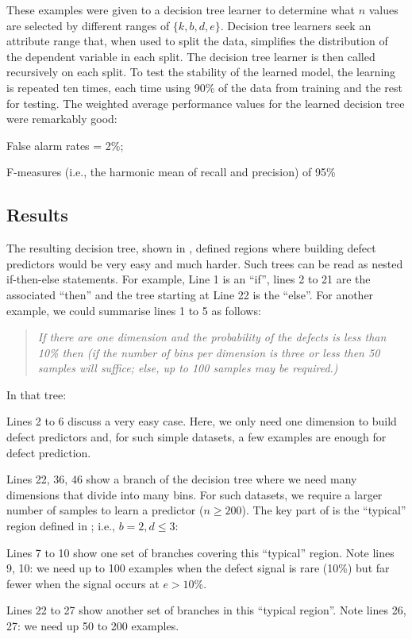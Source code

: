     These examples were given to a decision tree learner to determine what $n$ values are selected by different
    ranges of $\{k,b,d,e\}$. Decision tree learners seek an attribute range that, when used to split the data,
      simplifies the distribution of the dependent variable in each split.
      The decision tree learner is then called recursively on each split.  
      To test the stability of the learned model, the learning is repeated ten times, each time using 90\% of the data from training and the rest
      for testing. The weighted average performance values for the learned decision tree were remarkably good:
\squishlist
    \item False alarm rates = 2\%;
    \item F-measures (i.e., the harmonic mean of recall and precision) of 95\%
\squishend

\subsection{Results}

The resulting decision tree, shown in , defined regions where
building defect predictors would be very easy and much harder.
Such trees can be read as nested if-then-else statements. For example, Line 1 is an ``if'',
lines 2 to 21 are the associated ``then'' and the tree starting at Line 22 is the ``else''.
For another example, we could summarise lines 1 to 5 as follows:
\begin{quote}
{\em If there are one dimension and the probability of the defects is less than 10\% then (if
the number of bins per dimension is three or less then 50 samples will suffice; else, up to 100
samples may be required.)}
\end{quote}
In that tree:
\squishlist
\item
Lines 2 to 6 discuss a very easy case. Here, we only need
one dimension to build defect predictors and,
for such simple datasets, 
a few examples are enough for defect prediction.
\item
Lines 22, 36, 46 show a branch of the decision tree
where we need many dimensions that divide into many bins.
For such datasets, we require a larger number of samples to learn a predictor ($n \ge 200$).
\squishend
The key part of  is the ``typical'' region defined in ;
i.e.,    $b=2, d \le 3$:
\squishlist
\item Lines 7 to 10 show one set of branches covering this ``typical'' region. Note
lines 9, 10:  we need up to 100 examples when the defect signal is rare (10\%) but
far fewer when the signal occurs at $e>10$\%.
\item
Lines 22 to 27 show another set of branches in this ``typical region''. Note lines 26, 27:
we need up 50 to 200 examples.
\squishend

